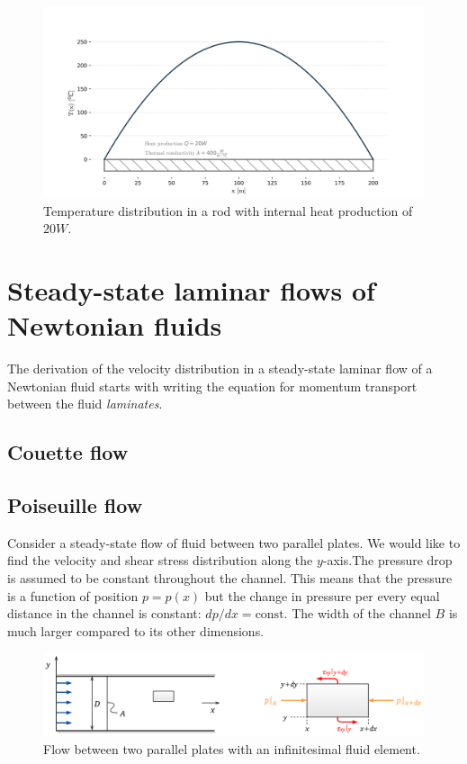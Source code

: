 \documentclass[10pt]{article}
\begin{document}
\begin{figure}[H]
\centering\includegraphics[width=16cm]{Code/conduction-rod.png}
\caption{Temperature distribution in a rod with internal heat production of $20 W$.}
\label{fig:python_graph}
\end{figure}

\newpage

\section{Steady-state laminar flows of Newtonian fluids}

The derivation of the velocity distribution in a steady-state laminar flow of a Newtonian fluid starts with writing the equation for momentum transport between the fluid \textit{laminates}.

\subsection{Couette flow}


\subsection{Poiseuille flow}

Consider a steady-state flow of fluid between two parallel plates. We would like to find the velocity and shear stress distribution along the $y$-axis.The pressure drop is assumed to be constant throughout the channel. This means that the pressure is a function of position $p = p(x)$ but the change in pressure per every equal distance in the channel is constant: $dp/dx = \text{const}$. The width of the channel $B$ is much larger compared to its other dimensions.

\begin{figure}[H]
\centering\includegraphics[width=15cm]{DWGs/poiseuille-fluid-element.png}
\caption{Flow between two parallel plates with an infinitesimal fluid element.}			
\label{fig:poiseuille-fluid-element}
\end{figure}
\end{document}
